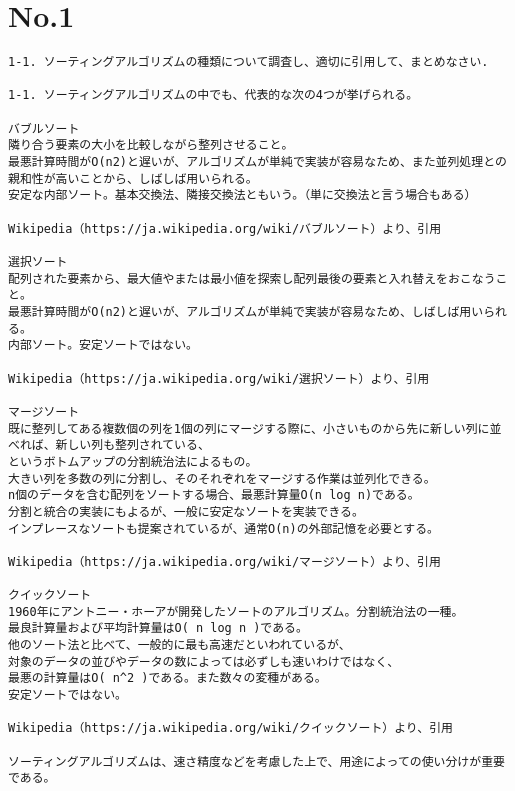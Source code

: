 \documentclass{jarticle}
\begin{document}
\section{No.1}
\begin{verbatim}
1-1. ソーティングアルゴリズムの種類について調査し、適切に引用して、まとめなさい.

1-1. ソーティングアルゴリズムの中でも、代表的な次の4つが挙げられる。

バブルソート
隣り合う要素の大小を比較しながら整列させること。
最悪計算時間がO(n2)と遅いが、アルゴリズムが単純で実装が容易なため、また並列処理との親和性が高いことから、しばしば用いられる。
安定な内部ソート。基本交換法、隣接交換法ともいう。（単に交換法と言う場合もある）

Wikipedia（https://ja.wikipedia.org/wiki/バブルソート）より、引用

選択ソート
配列された要素から、最大値やまたは最小値を探索し配列最後の要素と入れ替えをおこなうこと。
最悪計算時間がO(n2)と遅いが、アルゴリズムが単純で実装が容易なため、しばしば用いられる。
内部ソート。安定ソートではない。

Wikipedia（https://ja.wikipedia.org/wiki/選択ソート）より、引用

マージソート
既に整列してある複数個の列を1個の列にマージする際に、小さいものから先に新しい列に並べれば、新しい列も整列されている、
というボトムアップの分割統治法によるもの。
大きい列を多数の列に分割し、そのそれぞれをマージする作業は並列化できる。
n個のデータを含む配列をソートする場合、最悪計算量O(n log n)である。
分割と統合の実装にもよるが、一般に安定なソートを実装できる。
インプレースなソートも提案されているが、通常O(n)の外部記憶を必要とする。

Wikipedia（https://ja.wikipedia.org/wiki/マージソート）より、引用

クイックソート
1960年にアントニー・ホーアが開発したソートのアルゴリズム。分割統治法の一種。
最良計算量および平均計算量はO( n log n )である。
他のソート法と比べて、一般的に最も高速だといわれているが、
対象のデータの並びやデータの数によっては必ずしも速いわけではなく、
最悪の計算量はO( n^2 )である。また数々の変種がある。
安定ソートではない。

Wikipedia（https://ja.wikipedia.org/wiki/クイックソート）より、引用

ソーティングアルゴリズムは、速さ精度などを考慮した上で、用途によっての使い分けが重要である。
\end{verbatim}

\newpage
\end{document}
